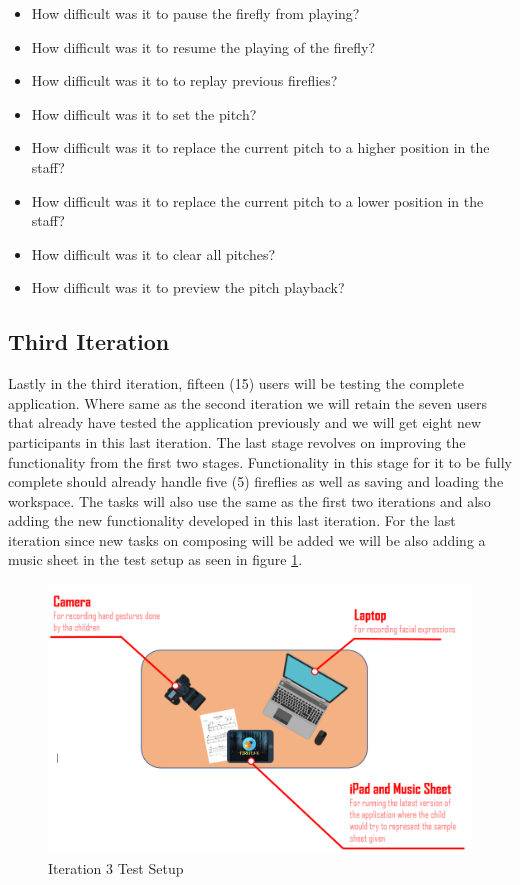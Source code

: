 \begin{itemize}
    \item How difficult was it to pause the firefly from playing?
    \item How difficult was it to resume the playing of the firefly?
    \item How difficult was it to to replay previous fireflies?
    \item How difficult was it to set the pitch? 
    \item How difficult was it to replace the current pitch to a higher position in the staff? 
    \item How difficult was it to replace the current pitch to a lower position in the staff?
    \item How difficult was it to clear all pitches? 
    \item How difficult was it to preview the pitch playback? 
\end{itemize}

\subsection{Third Iteration}
Lastly in the third iteration, fifteen (15) users will be testing the complete application. Where same as the second iteration we will retain the seven users that already have tested the application previously and we will get eight new participants in this last iteration. The last stage revolves on improving the functionality from the first two stages. Functionality in this stage for it to be fully complete should already handle five (5) fireflies as well as saving and loading the workspace. The tasks will also use the same as the first two iterations and also adding the new functionality developed in this last iteration. For the last iteration since new tasks on composing will be added we will be also adding a music sheet in the test setup as seen in figure \ref{test3}.

\begin{figure}[H]
    \centering
    \includegraphics[width=15cm]{figures/Test_Setup_Last.png}
    \caption{Iteration 3 Test Setup}
    \label{test3}
\end{figure}


